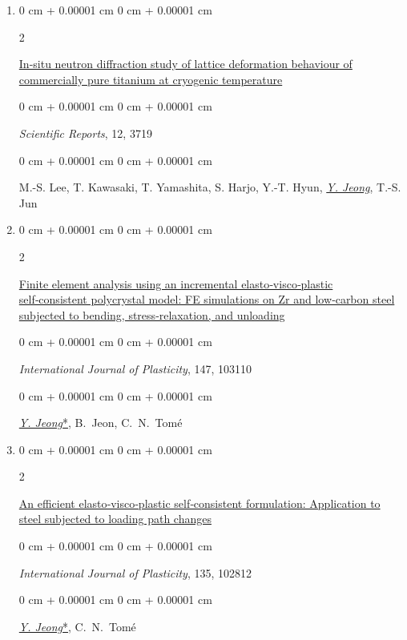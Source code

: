 \documentclass[10pt, letterpaper]{article}
\newenvironment{onecolentry}{
    \begin{adjustwidth}{
        0 cm + 0.00001 cm
    }{
        0 cm + 0.00001 cm
    }
}{
    \end{adjustwidth}
} %
\newenvironment{twocolentry}[2][]{
    \onecolentry
    \def\secondColumn{#2}
    \setcolumnwidth{\fill, 4.5 cm}
    \begin{paracol}{2}
}{
    \switchcolumn \raggedleft \secondColumn
    \end{paracol}
    \endonecolentry
} %
\begin{document}
\begin{enumerate}
        \item
        \begin{twocolentry}{2022}
            \href{https://doi.org/10.1038/s41598-022-07640-3}{In-situ neutron diffraction study of lattice deformation behaviour of commercially pure titanium at cryogenic temperature}
        \end{twocolentry}
        \begin{onecolentry}
            {\it Scientific Reports}, 12, 3719
        \end{onecolentry}
        \begin{onecolentry}
            M.-S. Lee, T. Kawasaki, T. Yamashita, S. Harjo, Y.-T. Hyun, {\underline{\textit{Y. Jeong}}}, T.-S. Jun
        \end{onecolentry}
        \vspace{0.10 cm}

        \item
        \begin{twocolentry}{2021}
            \href{https://doi.org/10.1016/j.ijplas.2021.103110}{Finite element analysis using an incremental elasto‑visco‑plastic self‑consistent polycrystal model: FE simulations on Zr and low‑carbon steel subjected to bending, stress‑relaxation, and unloading}
        \end{twocolentry}
        \begin{onecolentry}
            {\it International Journal of Plasticity}, 147, 103110
        \end{onecolentry}
        \begin{onecolentry}
            {\underline{\textit{Y. Jeong}*}}, \mbox{B. Jeon}, \mbox{C. N. Tomé}
        \end{onecolentry}
        \vspace{0.10 cm}

        \item
        \begin{twocolentry}{2020}
            \href{https://doi.org/10.1016/j.ijplas.2020.102812}{An efficient elasto‑visco‑plastic self‑consistent formulation: Application to steel subjected to loading path changes}
        \end{twocolentry}
        \begin{onecolentry}
            {\it International Journal of Plasticity}, 135, 102812
        \end{onecolentry}
        \begin{onecolentry}
            {\underline{\textit{Y. Jeong}*}}, \mbox{C. N. Tomé}
        \end{onecolentry}
        \vspace{0.10 cm}


\end{enumerate}
\end{document}
